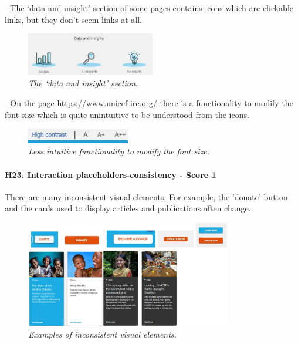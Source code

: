 \newline -	The ‘data and insight’ section of some pages contains icons which are clickable links, but they don’t seem links at all.
\begin{figure}[!h]
	\begin{center}
		\includegraphics[width=0.5\textwidth]{FinalScores25.jpg}
		\captionsetup{font=small}
		\caption{\textit{The ‘data and insight’ section.}}
	\end{center}
\end{figure}
\newline -	On the page \href{https://www.unicef-irc.org/}{https://www.unicef-irc.org/} there is a functionality to modify the font size which is quite unintuitive to be understood from the icons.
\begin{figure}[!h]
	\begin{center}
		\includegraphics[width=0.4\textwidth]{FinalScores26.jpg}
		\captionsetup{font=small}
		\caption{\textit{Less intuitive functionality to modify the font size.}}
	\end{center}
\end{figure}
\newline
\newline \paragraph{H23. Interaction placeholders-consistency - Score 1}  \label{subsec:H23}	There are many inconsistent visual elements. For example, the 'donate' button and the cards used to display articles and publications often change.
\begin{figure}[!h]
	\begin{center}
		\includegraphics[width=0.8\textwidth]{FinalScores27.jpg}
		\captionsetup{font=small}
		\caption{\textit{Examples of inconsistent visual elements.}}
	\end{center}
\end{figure}
